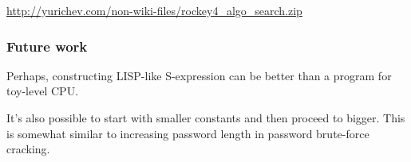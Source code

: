 \url{http://yurichev.com/non-wiki-files/rockey4_algo_search.zip}

\subsubsection{Future work}

Perhaps, constructing LISP-like S-expression can be better than a program for toy-level CPU.

It's also possible to start with smaller constants and then proceed to bigger.
This is somewhat similar to increasing password length in password brute-force cracking.

